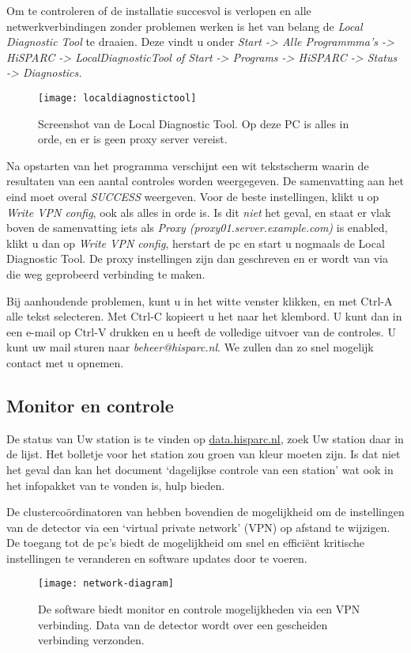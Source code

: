 Om te controleren of de installatie succesvol is verlopen en alle
netwerkverbindingen zonder problemen werken is het van belang de \emph{Local
Diagnostic Tool} te draaien. Deze vindt u onder \emph{Start -> Alle
Programmma’s -> HiSPARC -> LocalDiagnosticTool of Start -> Programs ->
HiSPARC -> Status -> Diagnostics.}

\begin{figure}
    \centering
    \texttt{[image: localdiagnostictool]}
    \caption{Screenshot van de Local Diagnostic Tool. Op deze PC is alles in orde, en er is geen proxy server vereist.}
    \label{fig:localdiagnostictool}
\end{figure}

Na opstarten van het programma verschijnt een wit tekstscherm waarin de
resultaten van een aantal controles worden weergegeven. De samenvatting
aan het eind moet overal \emph{SUCCESS} weergeven. Voor de beste instellingen,
klikt u op \emph{Write VPN config}, ook als alles in orde is. Is dit \emph{niet} het
geval, en staat er vlak boven de samenvatting iets als \emph{Proxy
(proxy01.server.example.com)} is enabled, klikt u dan op \emph{Write VPN
config}, herstart de pc en start u nogmaals de Local Diagnostic Tool. De
proxy instellingen zijn dan geschreven en er wordt van via die weg
geprobeerd verbinding te maken.

Bij aanhoudende problemen, kunt u in het witte venster klikken, en met
Ctrl-A alle tekst selecteren. Met Ctrl-C kopieert u het naar het
klembord. U kunt dan in een e-mail op Ctrl-V drukken en u heeft de
volledige uitvoer van de controles. U kunt uw mail sturen naar
\emph{beheer@hisparc.nl}. We zullen dan zo snel mogelijk contact met u opnemen.

\subsection{Monitor en controle}

De status van Uw station is te vinden op \url{data.hisparc.nl}, zoek Uw
station daar in de lijst. Het bolletje voor het station zou groen van
kleur moeten zijn. Is dat niet het geval dan kan het document
`dagelijkse controle van een station' wat ook in het infopakket van
\hisparc te vonden is, hulp bieden.


De clustercoördinatoren van \hisparc hebben bovendien de mogelijkheid om de
instellingen van de detector via een ‘virtual private network’ (VPN) op afstand 
te wijzigen. De toegang tot de pc’s biedt de mogelijkheid om snel en 
efficiënt kritische instellingen te veranderen en software updates door te voeren.

\begin{figure}
    \centering
    \texttt{[image: network-diagram]}
    \caption{De software biedt monitor en controle mogelijkheden via een VPN verbinding. Data van de detector wordt over een gescheiden verbinding verzonden.}
    \label{fig:network-diagram}
\end{figure}


